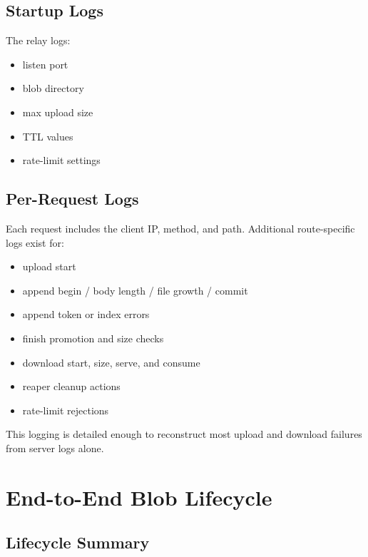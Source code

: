 \documentclass[11pt,a4paper]{report}
\begin{document}
\section{Startup Logs}

The relay logs:

\begin{itemize}[leftmargin=1.5cm]
    \item listen port
    \item blob directory
    \item max upload size
    \item TTL values
    \item rate-limit settings
\end{itemize}

\section{Per-Request Logs}

Each request includes the client IP, method, and path. Additional route-specific logs exist for:

\begin{itemize}[leftmargin=1.5cm]
    \item upload start
    \item append begin / body length / file growth / commit
    \item append token or index errors
    \item finish promotion and size checks
    \item download start, size, serve, and consume
    \item reaper cleanup actions
    \item rate-limit rejections
\end{itemize}

This logging is detailed enough to reconstruct most upload and download failures from server logs alone.

\chapter{End-to-End Blob Lifecycle}

\section{Lifecycle Summary}
\end{document}
